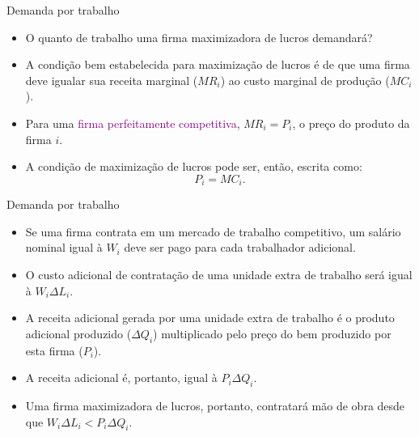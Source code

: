 \documentclass[10pt]{beamer}
\begin{document}
\begin{frame}{Demanda por trabalho}
    \begin{itemize}
        \item O quanto de trabalho uma firma maximizadora de lucros demandará?\bigskip

        \item A condição bem estabelecida para maximização de lucros é de que uma firma deve igualar sua receita marginal ($MR_i$) ao custo marginal de produção ($MC_i$).\bigskip

        \item Para uma \textcolor{purple}{firma perfeitamente competitiva}, $MR_i = P_i$, o preço do produto da firma $i$. \bigskip

        \item A condição de maximização de lucros pode ser, então, escrita como:
              \begin{equation}
                  P_i = MC_i.
                  \label{eq2}
              \end{equation}
    \end{itemize}
\end{frame}

\begin{frame}{Demanda por trabalho}
    \begin{itemize}
        \item Se uma firma contrata em um mercado de trabalho competitivo, um salário nominal igual à $W_i$ deve ser pago para cada trabalhador adicional.\bigskip

        \item O custo adicional de contratação de uma unidade extra de trabalho será igual à $W_i\Delta L_i$.\bigskip

        \item A receita adicional gerada por uma unidade extra de trabalho é o produto adicional produzido ($\Delta Q_i$) multiplicado pelo preço do bem produzido por esta firma ($P_i$).\bigskip

        \item A receita adicional é, portanto, igual à $P_i\Delta Q_i$.\bigskip

        \item Uma firma maximizadora de lucros, portanto, contratará mão de obra desde que $W_i\Delta L_i < P_i\Delta Q_i$.
    \end{itemize}
\end{frame}
\end{document}
